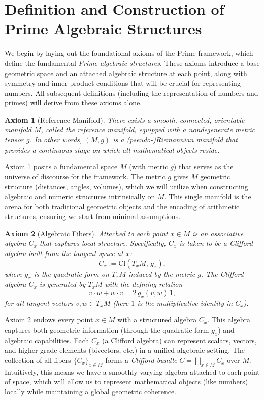\documentclass[11pt]{article}
\newtheorem{axiom}{Axiom}
\begin{document}
\section{Definition and Construction of Prime Algebraic Structures}

We begin by laying out the foundational axioms of the Prime framework, which define the fundamental \emph{Prime algebraic structures}. These axioms introduce a base geometric space and an attached algebraic structure at each point, along with symmetry and inner-product conditions that will be crucial for representing numbers. All subsequent definitions (including the representation of numbers and primes) will derive from these axioms alone.

\begin{axiom}[Reference Manifold]\label{ax:manifold}
There exists a smooth, connected, orientable manifold $M$, called the \emph{reference manifold}, equipped with a nondegenerate metric tensor $g$. In other words, $(M,g)$ is a (pseudo-)Riemannian manifold that provides a continuous stage on which all mathematical objects reside.
\end{axiom}

Axiom \ref{ax:manifold} posits a fundamental space $M$ (with metric $g$) that serves as the universe of discourse for the framework. The metric $g$ gives $M$ geometric structure (distances, angles, volumes), which we will utilize when constructing algebraic and numeric structures intrinsically on $M$. This single manifold is the arena for both traditional geometric objects and the encoding of arithmetic structures, ensuring we start from minimal assumptions.

\begin{axiom}[Algebraic Fibers]\label{ax:fibers}
Attached to each point $x \in M$ is an associative algebra $C_x$ that captures local structure. Specifically, $C_x$ is taken to be a \emph{Clifford algebra} built from the tangent space at $x$: 
\[ C_x := \mathrm{Cl}(T_xM,\,g_x), \] 
where $g_x$ is the quadratic form on $T_xM$ induced by the metric $g$. The Clifford algebra $C_x$ is generated by $T_xM$ with the defining relation 
\[ v \cdot w + w \cdot v = 2\,g_x(v,w)\,1, \] 
for all tangent vectors $v,w \in T_xM$ (here $1$ is the multiplicative identity in $C_x$).
\end{axiom}

Axiom \ref{ax:fibers} endows every point $x \in M$ with a structured algebra $C_x$. This algebra captures both geometric information (through the quadratic form $g_x$) and algebraic capabilities. Each $C_x$ (a Clifford algebra) can represent scalars, vectors, and higher-grade elements (bivectors, etc.) in a unified algebraic setting. The collection of all fibers $\{C_x\}_{x\in M}$ forms a \emph{Clifford bundle} $C = \bigsqcup_{x\in M} C_x$ over $M$. Intuitively, this means we have a smoothly varying algebra attached to each point of space, which will allow us to represent mathematical objects (like numbers) locally while maintaining a global geometric coherence.
\end{document}
